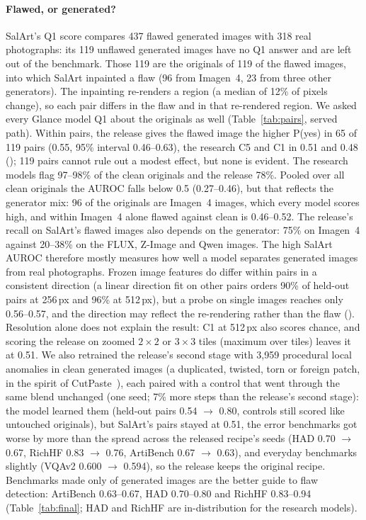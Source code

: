 \documentclass[10pt]{article}
\begin{document}
\paragraph{Flawed, or generated?} SalArt's Q1 score compares 437 flawed generated images with 318 real photographs: its 119 unflawed generated images have no Q1 answer and are left out of the benchmark. Those 119 are the originals of 119 of the flawed images, into which SalArt inpainted a flaw (96 from Imagen~4, 23 from three other generators). The inpainting re-renders a region (a median of 12\% of pixels change), so each pair differs in the flaw and in that re-rendered region. We asked every Glance model Q1 about the originals as well (Table~\ref{tab:pairs}, served path). Within pairs, the release gives the flawed image the higher P(yes) in 65 of 119 pairs (0.55, 95\% interval 0.46--0.63), the research C5 and C1 in 0.51 and 0.48 (); 119 pairs cannot rule out a modest effect, but none is evident. The research models flag 97--98\% of the clean originals and the release 78\%. Pooled over all clean originals the AUROC falls below 0.5 (0.27--0.46), but that reflects the generator mix: 96 of the originals are Imagen~4 images, which every model scores high, and within Imagen~4 alone flawed against clean is 0.46--0.52. The release's recall on SalArt's flawed images also depends on the generator: 75\% on Imagen~4 against 20--38\% on the FLUX, Z-Image and Qwen images. The high SalArt AUROC therefore mostly measures how well a model separates generated images from real photographs. Frozen image features do differ within pairs in a consistent direction (a linear direction fit on other pairs orders 90\% of held-out pairs at 256\,px and 96\% at 512\,px), but a probe on single images reaches only 0.56--0.57, and the direction may reflect the re-rendering rather than the flaw (). Resolution alone does not explain the result: C1 at 512\,px also scores chance, and scoring the release on zoomed $2\times2$ or $3\times3$ tiles (maximum over tiles) leaves it at 0.51. We also retrained the release's second stage with 3{,}959 procedural local anomalies in clean generated images (a duplicated, twisted, torn or foreign patch, in the spirit of CutPaste~\cite{cutpaste}), each paired with a control that went through the same blend unchanged (one seed; 7\% more steps than the release's second stage): the model learned them (held-out pairs 0.54 $\to$ 0.80, controls still scored like untouched originals), but SalArt's pairs stayed at 0.51, the error benchmarks got worse by more than the spread across the released recipe's seeds (HAD 0.70 $\to$ 0.67, RichHF 0.83 $\to$ 0.76, ArtiBench 0.67 $\to$ 0.63), and everyday benchmarks slightly (VQAv2 0.600 $\to$ 0.594), so the release keeps the original recipe. Benchmarks made only of generated images are the better guide to flaw detection: ArtiBench 0.63--0.67, HAD 0.70--0.80 and RichHF 0.83--0.94 (Table~\ref{tab:final}; HAD and RichHF are in-distribution for the research models).
\end{document}
